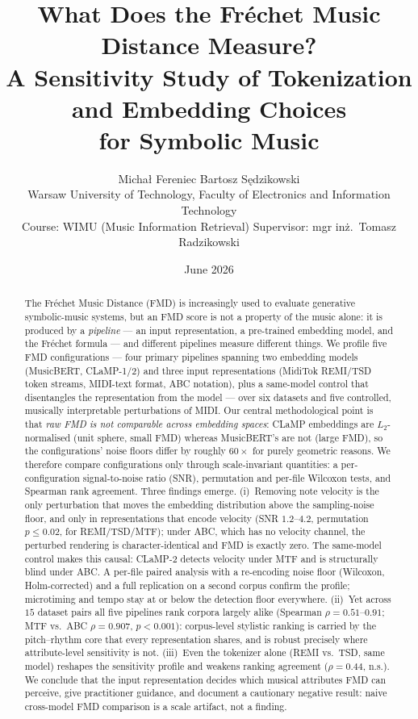 \documentclass[11pt]{article}
\title{\textbf{What Does the Fr\'echet Music Distance Measure?\\
A Sensitivity Study of Tokenization and Embedding Choices\\
for Symbolic Music}}
\author{Micha{\l} Fereniec \quad Bartosz S\k{e}dzikowski\\[2pt]
\small Warsaw University of Technology, Faculty of Electronics and Information Technology\\
\small Course: WIMU (Music Information Retrieval) \quad Supervisor: mgr in\.z.\ Tomasz Radzikowski}
\date{June 2026}
\begin{document}
\maketitle

\begin{abstract}
The Fr\'echet Music Distance (FMD) is increasingly used to evaluate
generative symbolic-music systems, but an FMD score is not a property of
the music alone: it is produced by a \emph{pipeline} --- an input
representation, a pre-trained embedding model, and the Fr\'echet formula
--- and different pipelines measure different things. We profile five FMD
configurations --- four primary pipelines spanning two embedding models
(MusicBERT, CLaMP-1/2) and three input representations (MidiTok REMI/TSD
token streams, MIDI-text format, ABC notation), plus a same-model control
that disentangles the representation from the model --- over six datasets
and five controlled, musically interpretable perturbations of MIDI. Our central
methodological point is that \emph{raw FMD is not comparable across
embedding spaces}: CLaMP embeddings are $L_2$-normalised (unit sphere,
small FMD) whereas MusicBERT's are not (large FMD), so the configurations'
noise floors differ by roughly $60\times$ for purely geometric reasons.
We therefore compare configurations only through scale-invariant
quantities: a per-configuration signal-to-noise ratio (SNR), permutation
and per-file Wilcoxon tests, and Spearman rank agreement. Three findings
emerge.
(i)~Removing note velocity is the only perturbation that moves the
embedding distribution above the sampling-noise floor, and only in
representations that encode velocity (SNR $1.2$--$4.2$, permutation
$p\le0.02$, for REMI/TSD/MTF); under ABC, which has no velocity channel,
the perturbed rendering is character-identical and FMD is exactly zero.
The same-model control makes this causal: CLaMP-2 detects velocity under
MTF and is structurally blind under ABC. A per-file paired analysis with a
re-encoding noise floor (Wilcoxon, Holm-corrected) and a full replication
on a second corpus confirm the profile; microtiming and tempo stay at or
below the detection floor everywhere.
(ii)~Yet across $15$ dataset pairs all five pipelines rank corpora largely
alike (Spearman $\rho=0.51$--$0.91$; MTF vs.\ ABC $\rho=0.907$,
$p<0.001$): corpus-level stylistic ranking is carried by the pitch--rhythm
core that every representation shares, and is robust precisely where
attribute-level sensitivity is not.
(iii)~Even the tokenizer alone (REMI vs.\ TSD, same model) reshapes the
sensitivity profile and weakens ranking agreement ($\rho=0.44$, n.s.). We
conclude that the input representation decides which musical attributes
FMD can perceive, give practitioner guidance, and document a cautionary
negative result: naive cross-model FMD comparison is a scale artifact, not
a finding.
\end{abstract}
\end{document}
